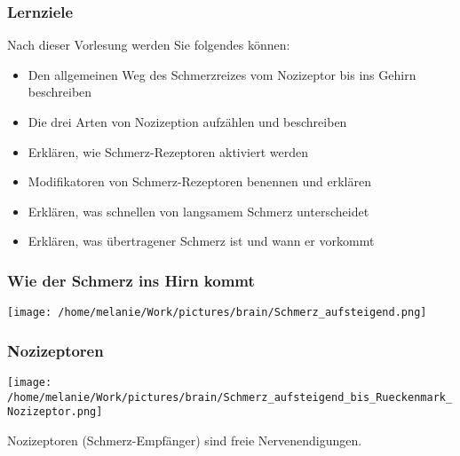 \documentclass{beamer}
\begin{document}
 \begin{frame}
\frametitle{Lernziele}


\begin{block}{Nach dieser Vorlesung werden Sie folgendes können:}



\begin{itemize}
\item
Den allgemeinen Weg des Schmerzreizes vom Nozizeptor bis ins Gehirn beschreiben
\item
Die drei Arten von Nozizeption aufzählen und beschreiben
\item
Erklären, wie Schmerz-Rezeptoren aktiviert werden
\item
Modifikatoren von Schmerz-Rezeptoren benennen und erklären
\item
Erklären, was schnellen von langsamem Schmerz unterscheidet
\item
Erklären, was  übertragener Schmerz ist und wann er vorkommt
\end{itemize}


\end{block}


\end{frame}




\begin{frame}
\frametitle{Wie der Schmerz ins Hirn kommt}

\begin{center}
\texttt{[image: /home/melanie/Work/pictures/brain/Schmerz\_aufsteigend.png]}
\end{center}

\end{frame}



\begin{frame}
\frametitle{Nozizeptoren}


\begin{center}
\texttt{[image: /home/melanie/Work/pictures/brain/Schmerz\_aufsteigend\_bis\_Rueckenmark\_Nozizeptor.png]}
\end{center}

Nozizeptoren (Schmerz-Empfänger) sind freie Nervenendigungen. 
 
\end{frame}
\end{document}
